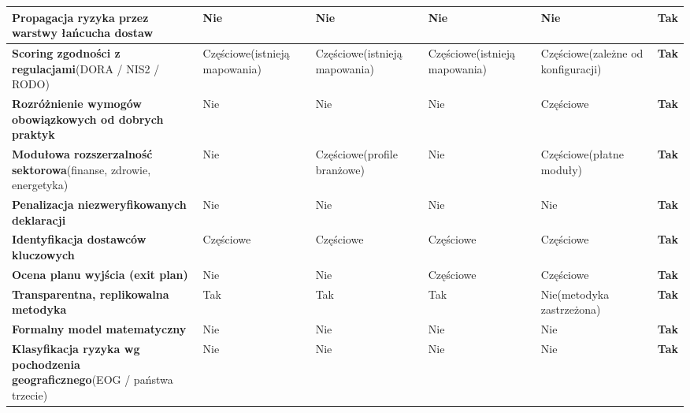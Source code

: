 \begin{longtable}{p{4.2cm}p{2.2cm}p{2.2cm}p{2.2cm}p{2.4cm}p{1.8cm}}
\textbf{Propagacja ryzyka przez warstwy łańcucha dostaw} 
& Nie 
& Nie 
& Nie 
& Nie 
& \textbf{Tak} \\
\midrule

\textbf{Scoring zgodności z regulacjami}\newline(DORA / NIS2 / RODO) 
& Częściowe\newline(istnieją mapowania) 
& Częściowe\newline(istnieją mapowania) 
& Częściowe\newline(istnieją mapowania) 
& Częściowe\newline(zależne od konfiguracji) 
& \textbf{Tak} \\
\midrule

\textbf{Rozróżnienie wymogów obowiązkowych od dobrych praktyk} 
& Nie 
& Nie 
& Nie 
& Częściowe 
& \textbf{Tak} \\
\midrule

\textbf{Modułowa rozszerzalność sektorowa}\newline(finanse, zdrowie, energetyka) 
& Nie 
& Częściowe\newline(profile branżowe) 
& Nie 
& Częściowe\newline(płatne moduły) 
& \textbf{Tak} \\
\midrule

\textbf{Penalizacja niezweryfikowanych deklaracji} 
& Nie 
& Nie 
& Nie 
& Nie 
& \textbf{Tak} \\
\midrule

\textbf{Identyfikacja dostawców kluczowych} 
& Częściowe 
& Częściowe 
& Częściowe 
& Częściowe 
& \textbf{Tak} \\
\midrule

\textbf{Ocena planu wyjścia (exit plan)} 
& Nie 
& Nie 
& Częściowe 
& Częściowe 
& \textbf{Tak} \\
\midrule

\textbf{Transparentna, replikowalna metodyka} 
& Tak 
& Tak 
& Tak 
& Nie\newline(metodyka zastrzeżona) 
& \textbf{Tak} \\
\midrule

\textbf{Formalny model matematyczny} 
& Nie 
& Nie 
& Nie 
& Nie 
& \textbf{Tak} \\
\midrule

\textbf{Klasyfikacja ryzyka wg pochodzenia geograficznego}\newline(EOG / państwa trzecie) 
& Nie 
& Nie 
& Nie 
& Nie 
& \textbf{Tak} \\

\end{longtable}


